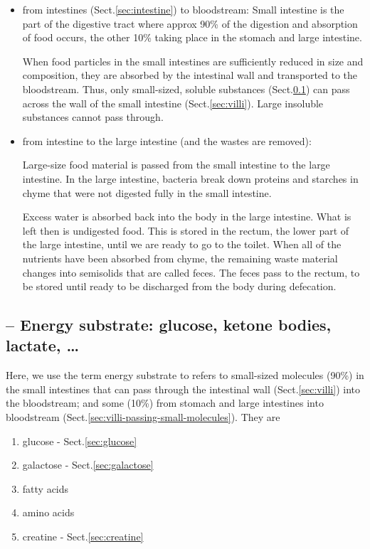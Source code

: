 \begin{itemize}
\begin{enumerate}
  \item 
\end{enumerate}


  \item from intestines (Sect.\ref{sec:intestine}) to bloodstream:
  Small intestine is the part of the digestive tract where approx 90\% of the
  digestion and absorption of food occurs, the other 10\% taking place in the stomach and
  large intestine.

     
When food particles in the small intestines are sufficiently reduced in size and
composition, they are absorbed by the intestinal wall and transported to the
bloodstream. Thus, only small-sized, soluble substances
(Sect.\ref{sec:energy-substrates}) can pass across the wall of the small
intestine (Sect.\ref{sec:villi}). Large insoluble substances cannot pass
through.


   \item from intestine to the large intestine (and the
  wastes are removed): 

Large-size food material is passed from the small intestine to the large
intestine. In the large intestine, bacteria break down proteins and starches in
chyme that were not digested fully in the small intestine.
 
Excess water is absorbed back into the body in the large intestine. What is left
then is undigested food. This is stored in the rectum, the lower part of the
large intestine, until we are ready to go to the toilet.  
When all of the nutrients have been absorbed from chyme, the remaining waste
material changes into semisolids that are called feces. The feces pass to the
rectum, to be stored until ready to be discharged from the body during
defecation.  
\end{itemize}



\subsection{-- Energy substrate: glucose, ketone bodies, lactate, \ldots}
\label{sec:energy-substrates}

Here, we use the term energy substrate to refers to small-sized molecules (90\%)
in the small intestines that can pass through the intestinal wall
(Sect.\ref{sec:villi}) into the bloodstream; and some (10\%) from stomach and
large intestines into bloodstream
(Sect.\ref{sec:villi-passing-small-molecules}).
They are
\begin{enumerate}
  \item glucose - Sect.\ref{sec:glucose}
  \item galactose - Sect.\ref{sec:galactose}
  \item fatty acids
  \item amino acids
  \item creatine - Sect.\ref{sec:creatine}
\end{enumerate}

